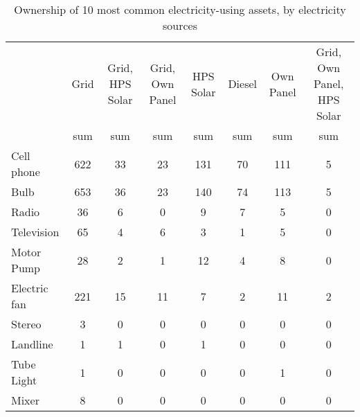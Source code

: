 \begin{table}[htbp]\centering
\def\sym#1{\ifmmode^{#1}\else\(^{#1}\)\fi}
\caption{Ownership of 10 most common electricity-using assets, by electricity sources \label{tab:"label"}}
\begin{tabular*}{0.9\hsize}{@{\hskip\tabcolsep\extracolsep\fill}l*{7}{c}}
\toprule
                                &     Grid&Grid, HPS Solar&Grid, Own Panel&HPS Solar&   Diesel&Own Panel&Grid, Own Panel, HPS Solar\\
                                &      sum&      sum&      sum&      sum&      sum&      sum&      sum\\
\midrule
Cell phone                      &      622&       33&       23&      131&       70&      111&        5\\
Bulb                            &      653&       36&       23&      140&       74&      113&        5\\
Radio                           &       36&        6&        0&        9&        7&        5&        0\\
Television                      &       65&        4&        6&        3&        1&        5&        0\\
Motor Pump                      &       28&        2&        1&       12&        4&        8&        0\\
Electric fan                    &      221&       15&       11&        7&        2&       11&        2\\
Stereo                          &        3&        0&        0&        0&        0&        0&        0\\
Landline                        &        1&        1&        0&        1&        0&        0&        0\\
Tube Light                      &        1&        0&        0&        0&        0&        1&        0\\
Mixer                           &        8&        0&        0&        0&        0&        0&        0\\
\bottomrule
\end{tabular*}
\end{table}
